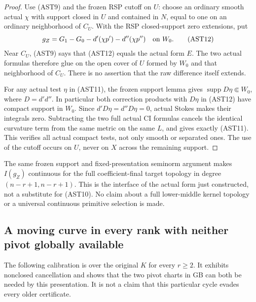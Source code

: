 \begin{proof}
Use (AST9) and the frozen RSP cutoff on $U$: choose an
ordinary smooth actual $\chi$ with support closed in $U$
and contained in $N$, equal to one on an ordinary neighborhood
of $C_U$.  With the RSP closed-support zero extensions, put
\[
       g_Z=G_1-G_0-d'(\chi p')-d''(\chi p'')
                                \quad\hbox{on }W_0.
 \tag{AST12}
\]
Near $C_U$, (AST9) says that (AST12) equals the actual form
$E$.  The two actual formulas therefore glue on the open
cover of $U$ formed by $W_0$ and that neighborhood of $C_U$.
There is no assertion that the raw difference itself extends.

For any actual test $\eta$ in (AST11), the frozen support
lemma gives $\operatorname{supp}D\eta\Subset W_0$, where
$D=d'd''$.  In particular both correction products with
$D\eta$ in (AST12) have compact support in $W_0$.
Since $d'D\eta=d''D\eta=0$, actual Stokes makes their
integrals zero.  Subtracting the two full actual CI formulas
cancels the identical curvature term from the same metric
on the same $L$, and gives exactly (AST11).  This verifies
all actual compact tests, not only smooth or separated ones.
The use of the cutoff occurs on $U$, never on $X$ across
the remaining support.
\end{proof}

The same frozen support and fixed-presentation seminorm argument
makes $I(g_Z)$ continuous for the full coefficient-final target
topology in degree $(n-r+1,n-r+1)$.  This is the interface of
the actual form just constructed, not a substitute for (AST10).
No claim about a full lower-middle kernel topology or a universal
continuous primitive selection is made.

\subsection{A moving curve in every rank with neither pivot globally available}

The following calibration is over the original $K$ for every
$r\ge2$.  It exhibits nonclosed cancellation and shows that the
two pivot charts in GB can both be needed by this presentation.
It is not a claim that this particular cycle evades every older
certificate.

